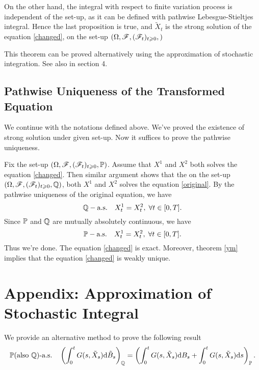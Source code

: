 \documentclass[8pt,onesided]{article}
\begin{document}
On the other hand, the integral with respect to finite variation process is independent of the set-up, as it can be defined with pathwise Lebesgue-Stieltjes integral. Hence the last proposition is true, and $\tilde X_t$ is the strong solution of the equation \ref{changed}, on the set-up $(\Omega, \mathscr{F}, (\mathscr{F}_t)_{t\geqslant 0}, )$

\begin{remark}
    This theorem can be proved alternatively using the approximation of stochastic integration. See also in section 4.
\end{remark}

\subsection{Pathwise Uniqueness of the Transformed Equation}

We continue with the notations defined above. We've proved the existence of strong solution under given set-up. Now it suffices to prove the pathwise uniqueness. 

Fix the set-up $(\Omega,\mathscr{F},(\mathscr{F}_t)_{t\geqslant0} ,\mathbb{P})$. Assume that $X^1$ and $X^2$ both solves the equation \ref{changed}. Then similar argument shows that the on the set-up $(\Omega, \mathscr{F},(\mathscr{F}_t)_{t\geqslant 0}, \mathbb{Q})$, both $X^1$ and $X^2$ solves the equation \ref{original}. By the pathwise uniqueness of the original equation, we have
\begin{equation*}
    \mathbb{Q}-\text{a.s.}\quad X^1_t= X^2_t ,\; \forall t\in[0,T].
\end{equation*}
Since $\mathbb{P}$ and $\mathbb{Q}$ are mutually absolutely continuous, we have
\begin{equation*}
    \mathbb{P}-\text{a.s.} \quad X^1_t=X^2_t ,\; \forall t\in [0,T].
\end{equation*}
Thus we're done. The equation \ref{changed} is exact. Moreover, theorem \ref{ym} implies that the equation \ref{changed} is weakly unique.

\section{Appendix: Approximation of Stochastic Integral}

We provide an alternative method to prove the following result
\begin{equation*}
\mathbb{P}\text{(also $\mathbb{Q}$)-a.s.}\quad 
\left(\int_0^t G(s,\tilde X_s)\dd\tilde B_s\right)_{\mathbb{Q}}=\left(\int_0^t G(s,\tilde X_s)\dd B_s +\int_0^t G(s,\tilde X_s) \dd s\right)_{\mathbb{P}}. 
\end{equation*}
\end{document}

